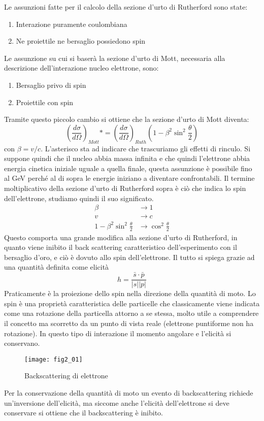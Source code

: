 Le assunzioni fatte per il calcolo della sezione d'urto di Rutherford sono state:
\begin{enumerate}
\item Interazione puramente coulombiana
\item Ne proiettile ne bersaglio possiedono spin
\end{enumerate}
Le assunzione su cui si baserà la sezione d'urto di Mott, necessaria alla descrizione dell'interazione nucleo elettrone, sono:
\begin{enumerate}
\item Bersaglio privo di spin
\item Proiettile con spin
\end{enumerate}
Tramite questo piccolo cambio si ottiene che la sezione d'urto di Mott diventa:
\begin{equation}
\left(\frac{d\sigma}{d\Omega}\right)_{Mott} *=\left(\frac{d\sigma}{d\Omega}\right)_{Ruth}\left(1-\beta^2\sin^2\frac{\theta}{2}\right)
\end{equation}
con $\beta=v/c$.
L'asterisco sta ad indicare che trascuriamo gli effetti di rinculo.
Si suppone quindi che il nucleo abbia massa infinita e che quindi l'elettrone abbia energia cinetica iniziale uguale a quella finale, questa assunzione è possibile fino al GeV perché al di sopra le energie iniziano a diventare confrontabili.
Il termine moltiplicativo della sezione d'urto di Rutherford sopra è ciò che indica lo spin dell'elettrone, studiamo quindi il suo significato.
\begin{equation}
\begin{split}
\beta&\to1\\
v&\to c\\
1-\beta^2\sin^2\frac{\theta}{2}&\to \cos^2\frac{\theta}{2}
\end{split}
\end{equation}
Questo comporta una grande modifica alla sezione d'urto di Rutherford, in quanto viene inibito il back scattering caratteristico dell'esperimento con il bersaglio d'oro, e ciò è dovuto allo spin dell'elettrone.
Il tutto si spiega grazie ad una quantità definita come elicità
\begin{equation}
h=\frac{\bar s\cdot \bar p}{|s||p|}
\end{equation}
Praticamente è la proiezione dello spin nella direzione della quantità di moto.
Lo spin è una proprietà caratteristica delle particelle che classicamente viene indicata come una rotazione della particella attorno a se stessa, molto utile a comprendere il concetto ma scorretto da un punto di vista reale (elettrone puntiforme non ha rotazione).
In questo tipo di interazione il momento angolare e l'elicità si conservano.
\begin{figure}[h]
\centering
\texttt{[image: fig2\_01]}
\caption{Backscattering di elettrone}
\label{fig:2.01}
\end{figure}
Per la conservazione della quantità di moto un evento di backscattering richiede un'inversione dell'elicità, ma siccome anche l'elicità dell'elettrone si deve conservare si ottiene che il backscattering è inibito.

